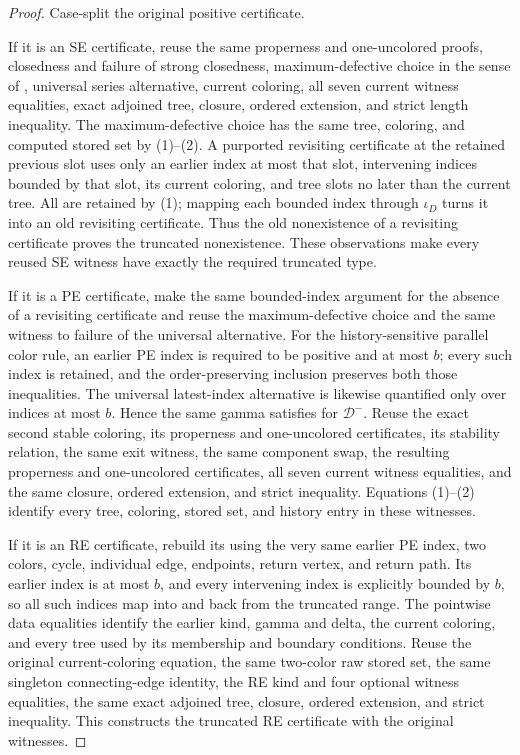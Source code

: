 \begin{proof}
Case-split the original positive certificate.

If it is an SE certificate, reuse the same properness and one-uncolored
proofs, closedness and failure of strong closedness, maximum-defective
choice in the sense of , universal
series alternative, current coloring, all seven
current witness equalities, exact adjoined tree, closure, ordered
extension, and strict length inequality.  The maximum-defective choice
has the same tree, coloring, and computed stored set by (1)--(2).  A
purported revisiting certificate at the retained previous slot uses only
an earlier index at most that slot, intervening indices bounded by that
slot, its current coloring, and tree slots no later than the current
tree.  All are retained by (1); mapping each bounded index through
$\iota_D$ turns it into an old revisiting certificate.  Thus the old
nonexistence of a revisiting certificate proves the truncated
nonexistence.  These observations make every reused SE witness have
exactly the required truncated type.

If it is a PE certificate, make the same bounded-index argument for the
absence of a revisiting certificate and reuse the maximum-defective
choice and the same witness to failure of the universal alternative.
For the history-sensitive parallel color rule, an earlier PE index is
required to be positive and at most $b$; every such index is retained,
and the order-preserving inclusion preserves both those inequalities.
The universal latest-index alternative is likewise quantified only over
indices at most $b$.  Hence the same gamma satisfies
 for $\mathcal D^-$.  Reuse the exact
second stable coloring, its properness and one-uncolored certificates,
its stability relation, the same exit witness, the same component swap,
the resulting properness and one-uncolored certificates, all seven
current witness equalities, and the same closure, ordered extension, and
strict inequality.  Equations (1)--(2) identify every tree, coloring,
stored set, and history entry in these witnesses.

If it is an RE certificate, rebuild its
 using the very same earlier PE
index, two colors, cycle, individual edge, endpoints, return vertex, and
return path.  Its earlier index is at most $b$, and every intervening
index is explicitly bounded by $b$, so all such indices map into and
back from the truncated range.  The pointwise data equalities identify
the earlier kind, gamma and delta, the current coloring, and every tree
used by its membership and boundary conditions.  Reuse the original
current-coloring equation, the same two-color raw stored set, the same
singleton connecting-edge identity, the RE kind and four optional
witness equalities, the same exact adjoined tree, closure, ordered
extension, and strict inequality.  This constructs the truncated RE
certificate with the original witnesses.


\end{proof}
